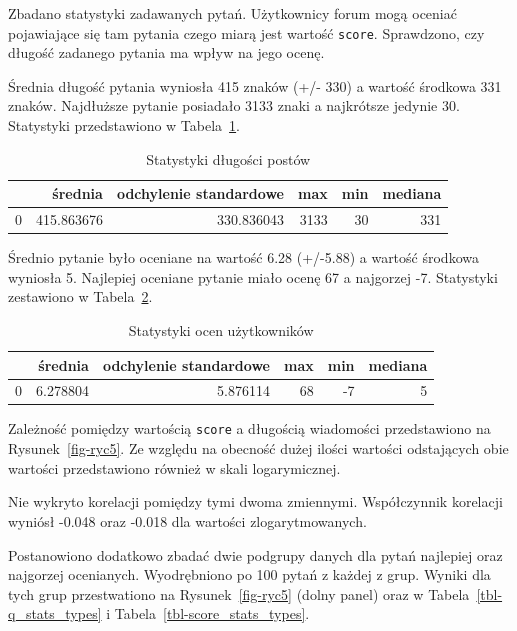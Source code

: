 \documentclass[
  letterpaper,
  DIV=11,
  numbers=noendperiod]{scrreprt}
\begin{document}
Zbadano statystyki zadawanych pytań. Użytkownicy forum mogą oceniać
pojawiające się tam pytania czego miarą jest wartość \texttt{score}.
Sprawdzono, czy długość zadanego pytania ma wpływ na jego ocenę.

Średnia długość pytania wyniosła 415 znaków (+/- 330) a wartość środkowa
331 znaków. Najdłuższe pytanie posiadało 3133 znaki a najkrótsze jedynie
30. Statystyki przedstawiono w Tabela~\ref{tbl-q_stats}.

\hypertarget{tbl-q_stats}{}
\begin{table}
\caption{\label{tbl-q_stats}Statystyki długości postów }\tabularnewline

\centering
\begin{tabular}{lrrrrr}
\toprule
{} &     średnia &  odchylenie standardowe &   max &  min &  mediana \\
\midrule
0 &  415.863676 &              330.836043 &  3133 &   30 &      331 \\
\bottomrule
\end{tabular}
\end{table}

Średnio pytanie było oceniane na wartość 6.28 (+/-5.88) a wartość
środkowa wyniosła 5. Najlepiej oceniane pytanie miało ocenę 67 a
najgorzej -7. Statystyki zestawiono w Tabela~\ref{tbl-score_stats}.

\hypertarget{tbl-score_stats}{}
\begin{table}
\caption{\label{tbl-score_stats}Statystyki ocen użytkowników }\tabularnewline

\centering
\begin{tabular}{lrrrrr}
\toprule
{} &   średnia &  odchylenie standardowe &  max &  min &  mediana \\
\midrule
0 &  6.278804 &                5.876114 &   68 &   -7 &        5 \\
\bottomrule
\end{tabular}
\end{table}

Zależność pomiędzy wartością \texttt{score} a długością wiadomości
przedstawiono na Rysunek~\ref{fig-ryc5}. Ze względu na obecność dużej
ilości wartości odstających obie wartości przedstawiono również w skali
logarymicznej.

Nie wykryto korelacji pomiędzy tymi dwoma zmiennymi. Współczynnik
korelacji wyniósł -0.048 oraz -0.018 dla wartości zlogarytmowanych.

Postanowiono dodatkowo zbadać dwie podgrupy danych dla pytań najlepiej
oraz najgorzej ocenianych. Wyodrębniono po 100 pytań z każdej z grup.
Wyniki dla tych grup przestwationo na Rysunek~\ref{fig-ryc5} (dolny
panel) oraz w Tabela~\ref{tbl-q_stats_types} i
Tabela~\ref{tbl-score_stats_types}.
\end{document}
